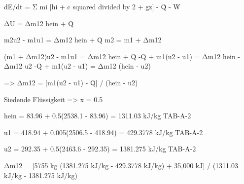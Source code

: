 dE/dt = Σ mi [hi + c squared divided by 2 + gz] - Q̇ - Ẇ  

ΔU = Δm12 hein + Q̇  

m2u2 - m1u1 = Δm12 hein + Q̇  
m2 = m1 + Δm12  

(m1 + Δm12)u2 - m1u1 = Δm12 hein + Q̇  
-Q̇ + m1(u2 - u1) = Δm12 hein - Δm12 u2  
-Q̇ + m1(u2 - u1) = Δm12 (hein - u2)  

=> Δm12 = [m1(u2 - u1) - Q̇] / (hein - u2)  

Siedende Flüssigkeit => x = 0.5  

hein = 83.96 + 0.5(2538.1 - 83.96) = 1311.03 kJ/kg  
TAB-A-2  

u1 = 418.94 + 0.005(2506.5 - 418.94) = 429.3778 kJ/kg  
TAB-A-2  

u2 = 292.35 + 0.5(2463.6 - 292.35) = 1381.275 kJ/kg  
TAB-A-2  

Δm12 = [5755 kg (1381.275 kJ/kg - 429.3778 kJ/kg) + 35,000 kJ] / (1311.03 kJ/kg - 1381.275 kJ/kg)
